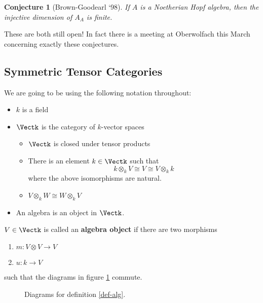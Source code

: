 \documentclass[12pt]{article}
\theoremstyle{break}
\theoremstyle{nonumberbreak}
\theoremstyle{changebreak}
\theoremstyle{break}
\theoremstyle{nonumberbreak}
\theoremstyle{nonumberplain}
\newtheorem{conj}{Conjecture}
\theoremstyle{change}
\DeclareMathOperator{\id}{id}
\begin{document}
\begin{conj}[Brown-Goodearl `98]
	If $A$ is a Noetherian Hopf algebra, then the injective dimension of $A_A$ is finite.
\end{conj}

These are both still open! In fact there is a meeting at Oberwolfach this March concerning
exactly these conjectures.

\subsection{Symmetric Tensor Categories}
We are going to be using the following notation throughout:
\begin{itemize}
	\item $k$ is a field
	\item $\Vectk$ is the category of $k$-vector spaces
	\begin{itemize}
		\item $\Vectk$ is closed under tensor products
		\item There is an element $k\in\Vectk$ such that
		\[k\otimes_k V\cong V\cong V\otimes_k k\]
		where the above isomorphisms are natural.
		\item $V\otimes_k W\cong W\otimes_k V$
	\end{itemize}
	\item An algebra is an object in $\Vectk$.
\end{itemize}

\begin{defn}\label{def-alg}
	$V\in\Vectk$ is called an \textbf{algebra object} if there are two morphisms
	\begin{enumerate}
		\item $m:V\otimes V\to V$
		\item $u:k\to V$
	\end{enumerate}
	such that the diagrams in figure \ref{fig-alg} commute.
	
\end{defn}
\begin{figure}\label{fig-alg}
	\caption{Diagrams for definition \ref{def-alg}.}
\end{figure}
\end{document}
